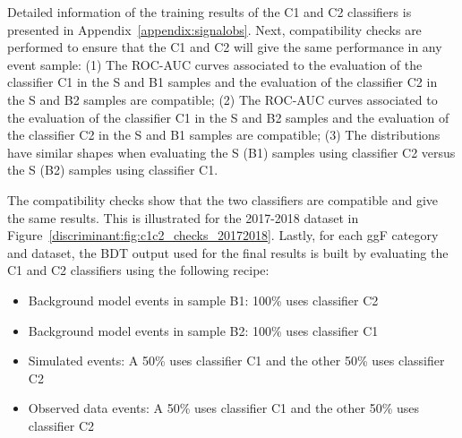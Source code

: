Detailed information of the training results of the C1 and C2 classifiers is presented in Appendix~\ref{appendix:signalobs}. Next, compatibility checks are performed to ensure that the C1 and C2 will give the same performance in any event sample: (1) The ROC-AUC curves associated to the evaluation of the classifier C1 in the S and B1 samples and the evaluation of the classifier C2 in the S and B2 samples are compatible; (2) The ROC-AUC curves associated to the evaluation of the classifier C1 in the S and B2 samples and the evaluation of the classifier C2 in the S and B1 samples are compatible; (3) The distributions have similar shapes when evaluating the S (B1) samples using classifier C2 versus the S (B2) samples using classifier C1.

The compatibility checks show that the two classifiers are compatible and give the same results. This is illustrated for the 2017-2018 dataset in Figure~\ref{discriminant:fig:c1c2_checks_20172018}. Lastly, for each ggF category and dataset, the BDT output used for the final results is built by evaluating the C1 and C2 classifiers using the following recipe: 
\begin{itemize}
  \item Background model events in sample B1: 100\% uses classifier C2 
  \item Background model events in sample B2: 100\% uses classifier C1
  \item Simulated events: A 50\% uses classifier C1 and the other 50\% uses classifier C2
  \item Observed data events: A 50\% uses classifier C1 and the other 50\% uses classifier C2
\end{itemize}

